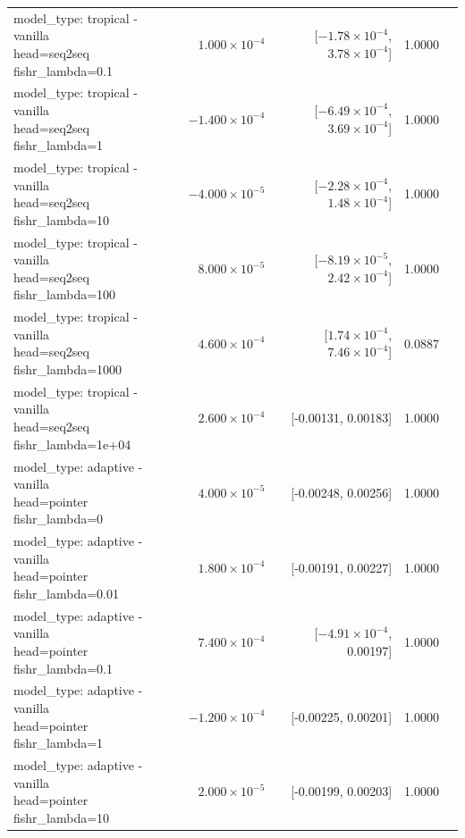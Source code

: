 \documentclass[10pt]{article}
\makeatletter
\newcommand{\stackcell}[1]{\begin{tabular}[t]{@{}l@{}}#1\end{tabular}}
\makeatother
\begin{document}
{\begin{longtable}{lrrrl}
\stackcell{model\_type: tropical - vanilla\\\footnotesize head=seq2seq fishr\_lambda=0.1 } & $1.000\times10^{-4}$ & [$-1.78\times10^{-4}$, $3.78\times10^{-4}$] & 1.0000 & \\
\stackcell{model\_type: tropical - vanilla\\\footnotesize head=seq2seq fishr\_lambda=1 } & $-1.400\times10^{-4}$ & [$-6.49\times10^{-4}$, $3.69\times10^{-4}$] & 1.0000 & \\
\stackcell{model\_type: tropical - vanilla\\\footnotesize head=seq2seq fishr\_lambda=10 } & $-4.000\times10^{-5}$ & [$-2.28\times10^{-4}$, $1.48\times10^{-4}$] & 1.0000 & \\
\stackcell{model\_type: tropical - vanilla\\\footnotesize head=seq2seq fishr\_lambda=100 } & $8.000\times10^{-5}$ & [$-8.19\times10^{-5}$, $2.42\times10^{-4}$] & 1.0000 & \\
\stackcell{model\_type: tropical - vanilla\\\footnotesize head=seq2seq fishr\_lambda=1000 } & $4.600\times10^{-4}$ & [$1.74\times10^{-4}$, $7.46\times10^{-4}$] & 0.0887 & \\
\stackcell{model\_type: tropical - vanilla\\\footnotesize head=seq2seq fishr\_lambda=1e+04 } & $2.600\times10^{-4}$ & [-0.00131, 0.00183] & 1.0000 & \\
\stackcell{model\_type: adaptive - vanilla\\\footnotesize head=pointer fishr\_lambda=0 } & $4.000\times10^{-5}$ & [-0.00248, 0.00256] & 1.0000 & \\
\stackcell{model\_type: adaptive - vanilla\\\footnotesize head=pointer fishr\_lambda=0.01 } & $1.800\times10^{-4}$ & [-0.00191, 0.00227] & 1.0000 & \\
\stackcell{model\_type: adaptive - vanilla\\\footnotesize head=pointer fishr\_lambda=0.1 } & $7.400\times10^{-4}$ & [$-4.91\times10^{-4}$, 0.00197] & 1.0000 & \\
\stackcell{model\_type: adaptive - vanilla\\\footnotesize head=pointer fishr\_lambda=1 } & $-1.200\times10^{-4}$ & [-0.00225, 0.00201] & 1.0000 & \\
\stackcell{model\_type: adaptive - vanilla\\\footnotesize head=pointer fishr\_lambda=10 } & $2.000\times10^{-5}$ & [-0.00199, 0.00203] & 1.0000 & \\

\end{longtable}}
\end{document}
